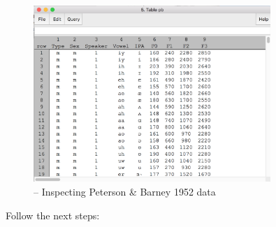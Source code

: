 \begin{figure}[!tbp]
\caption{\Praat{} -- Inspecting Peterson \& Barney 1952 data}
\label{praat-pb-table-inspection}
	\begin{center}
		\includegraphics[width=0.8\textwidth]{./figures/Praat-19-PB-table-inspect}
	\end{center}
\end{figure}

Follow the next steps:

